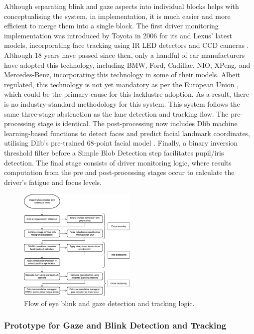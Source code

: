 \documentclass[9pt,conference]{IEEEtran}
\begin{document}
Although separating blink and gaze aspects into individual blocks helps with conceptualising the system, in implementation, it is much easier and more efficient to merge them into a single block. The first driver monitoring implementation was introduced by Toyota in 2006 for its and Lexus' latest models, incorporating face tracking using IR LED detectors and CCD cameras \cite{b11}. Although 18 years have passed since then, only a handful of car manufacturers have adopted this technology, including BMW, Ford, Cadillac, NIO, XPeng, and Mercedes-Benz, incorporating this technology in some of their models. Albeit regulated, this technology is not yet mandatory as per the European Union \cite{b12}, which could be the primary cause for this lacklustre adoption. As a result, there is no industry-standard methodology for this system. This system follows the same three-stage abstraction as the lane detection and tracking flow. The pre-processing stage is identical. The post-processing now includes Dlib machine learning-based functions \cite{b13} to detect faces and predict facial landmark coordinates, utilising Dlib's pre-trained 68-point facial model \cite{b14}. Finally, a binary inversion threshold filter before a Simple Blob Detection step facilitates pupil/iris detection. The final stage consists of driver monitoring logic, where results computation from the pre and post-processing stages occur to calculate the driver's fatigue and focus levels.

\begin{figure}[htbp]
    \centerline{\includegraphics[width=0.5\textwidth]{assets/eye-detection-flow.png}}
    \caption{Flow of eye blink and gaze detection and tracking logic.}
    \label{f5}
\end{figure}

\subsubsection{Prototype for Gaze and Blink Detection and Tracking}
\end{document}
